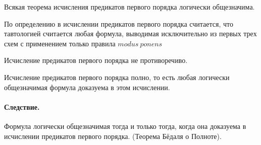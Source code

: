 \begin{theorem}
Всякая теорема исчисления предикатов первого порядка логически общезначима.
\end{theorem}


По определению в исчислении предикатов первого порядка
считается, что тавтологией считается любая формула, выводимая исключительно
из первых трех схем с применением только правила $modus \ ponens$

Исчисление предикатов первого порядка не противоречиво.

\begin{theorem}
Исчисление предикатов первого порядка полно, то есть любая логически общезначимая формула
доказуема в этом исчислении.
\end{theorem}

\paragraph*{Следствие.}
Формула логически общезначимая тогда и только тогда, когда она доказуема в исчислении предикатов
первого порядка. (Теорема Бёдаля о Полноте).



